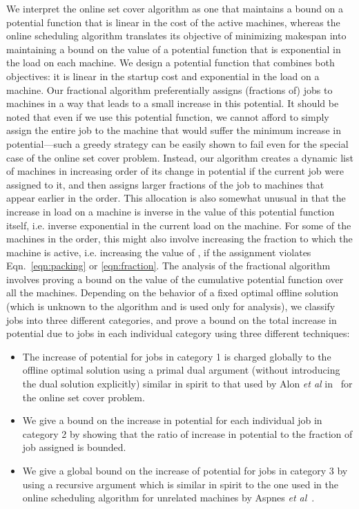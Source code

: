 \documentclass[11pt]{article}
\begin{document}
We interpret the online set cover algorithm as one that 
maintains a bound on a potential function that is linear in the cost of the 
active machines, whereas the online scheduling algorithm translates its 
objective of minimizing makespan into maintaining a bound on the value of 
a potential function that is exponential in the load on each machine. We 
design a potential function that combines both objectives: it is linear in
the startup cost and exponential in the load on a machine. Our fractional
algorithm preferentially assigns (fractions of) jobs to machines in a way that 
leads to a small increase in this potential. It should be noted that even 
if we use this potential function, we cannot afford to simply assign
the entire job  to the machine that would suffer the minimum increase in 
potential---such a 
greedy strategy can be easily shown to fail even for the special case of the
online set cover problem. Instead, our algorithm creates a dynamic list of 
machines in increasing order of its change in potential if the current job 
were assigned to it, and then assigns larger fractions of the job to 
machines that appear earlier in the order. 
This allocation is also somewhat unusual in that
the increase in load on a machine is inverse in the 
value of this potential function itself, i.e. inverse exponential in the
current load on the machine. For some of the machines in the
order, this might also involve increasing the fraction to which the machine
is active, i.e. increasing the value of , if the assignment violates 
Eqn.~\ref{eqn:packing} or \ref{eqn:fraction}. The analysis of the fractional
algorithm involves proving a bound on the value of the cumulative
potential function over all the machines. Depending on the behavior of a
fixed optimal offline solution (which is unknown to the algorithm and is 
used only for analysis), we classify jobs into three different categories, and
prove a bound on the total increase in potential due to jobs in each individual
category using three different techniques:
\begin{itemize}
\item The increase of potential for jobs in category 1 is charged globally to 
the offline optimal solution using a primal dual argument (without introducing
the dual solution explicitly) similar in spirit to that used by Alon {\em et al} 
in~\cite{AlonAABN09} for the online set cover problem.
\item We give a bound on the increase in potential for each individual job in 
category 2 by showing that the ratio of increase in potential to the fraction
of job assigned is bounded.
\item We give a global bound on the increase of potential for jobs in category
3 by using a recursive argument which is similar in spirit 
to the one used in the online scheduling
algorithm for unrelated machines by Aspnes {\em et al}~\cite{AspnesAFPW97}.
\end{itemize}
\end{document}
